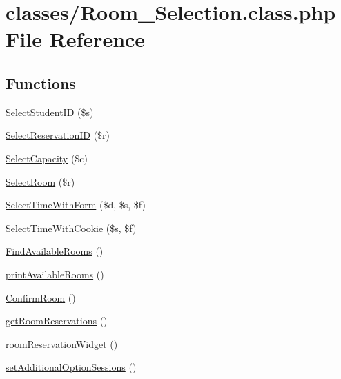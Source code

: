 \hypertarget{_room___selection_8class_8php}{}\section{classes/\+Room\+\_\+\+Selection.class.\+php File Reference}
\label{_room___selection_8class_8php}
\subsection*{Functions}
\begin{DoxyCompactItemize}
\item 
\mbox{\hyperlink{_room___selection_8class_8php_a1014e84155fb117997cf11fcab3c3d22}{Select\+Student\+ID}} (\$s)
\item 
\mbox{\hyperlink{_room___selection_8class_8php_a844d4eb0022335945cf36729cbeee645}{Select\+Reservation\+ID}} (\$r)
\item 
\mbox{\hyperlink{_room___selection_8class_8php_a76636000b94ea99486d48b0cf946430a}{Select\+Capacity}} (\$c)
\item 
\mbox{\hyperlink{_room___selection_8class_8php_a15f7f352af1caf97b352f4db79d5c932}{Select\+Room}} (\$r)
\item 
\mbox{\hyperlink{_room___selection_8class_8php_a2fa31ac8825981cc1c7b9e0ae2882b15}{Select\+Time\+With\+Form}} (\$d, \$s, \$f)
\item 
\mbox{\hyperlink{_room___selection_8class_8php_a0df97fd941faa49c5932879ede080944}{Select\+Time\+With\+Cookie}} (\$s, \$f)
\item 
\mbox{\hyperlink{_room___selection_8class_8php_a65dc1d8579dc730a5a4db6799c7fde4a}{Find\+Available\+Rooms}} ()
\item 
\mbox{\hyperlink{_room___selection_8class_8php_af4a06b6f962b7a3a2c23568743295670}{print\+Available\+Rooms}} ()
\item 
\mbox{\hyperlink{_room___selection_8class_8php_a0e67cda8ce5c20c885c55a2b7eaf478c}{Confirm\+Room}} ()
\item 
\mbox{\hyperlink{_room___selection_8class_8php_ade932fe6af13dca6fad6841780807039}{get\+Room\+Reservations}} ()
\item 
\mbox{\hyperlink{_room___selection_8class_8php_a1459b40a236d0f61087f7b2e06b5cacf}{room\+Reservation\+Widget}} ()
\item 
\mbox{\hyperlink{_room___selection_8class_8php_aca5696df7c068ede3f87a7d8e26e8a6b}{set\+Additional\+Option\+Sessions}} ()
\end{DoxyCompactItemize}
